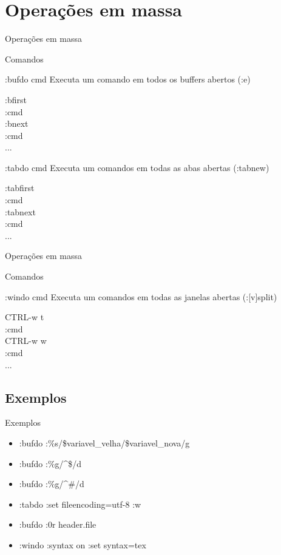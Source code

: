 \section{Operações em massa}
\begin{frame}{Operações em massa}
\begin{block}{Comandos}
	\begin{alert}{:bufdo cmd}
		Executa um comando em todos os buffers abertos (:e) \\
	\end{alert}
	:bfirst \\
	:cmd \\
	:bnext \\
	:cmd \\
	... \\
	\begin{alert}{:tabdo cmd}
		Executa um comandos em todas as abas abertas (:tabnew)\\
	\end{alert}
	:tabfirst \\
	:cmd \\
	:tabnext \\
	:cmd \\
	... \\
\end{block}
\end{frame}
\begin{frame}{Operações em massa}
\begin{block}{Comandos}
	\begin{alert}{:windo cmd}
		Executa um comandos em todas as janelas abertas (:[v]split)\\
	\end{alert}
	CTRL-w t \\
	:cmd \\ 
	CTRL-w w \\
	:cmd \\
	... \\
\end{block}
\end{frame}
\subsection{Exemplos}
\begin{frame}{Exemplos}
	\begin{itemize}
		\item :bufdo :\%s/\$variavel\_velha/\$variavel\_nova/g
		\item :bufdo :\%g/\textasciicircum\$/d
		\item :bufdo :\%g/\textasciicircum\#/d
		\item :tabdo :set fileencoding=utf-8 \textbar :w
		\item :bufdo :0r header.file
		\item :windo :syntax on \textbar :set syntax=tex
	\end{itemize}
\end{frame}
